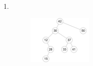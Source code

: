 \documentclass[11pt,a4paper]{article}
\begin{document}
\begin{loesung}
    \begin{enumerate}
        \item \ \\
        \begin{figure}[h!]
            \centering
            \includegraphics[width=0.3\textwidth]{img/2a}
        \end{figure}
        \FloatBarrier
    \end{enumerate}
\end{loesung}
\end{document}
